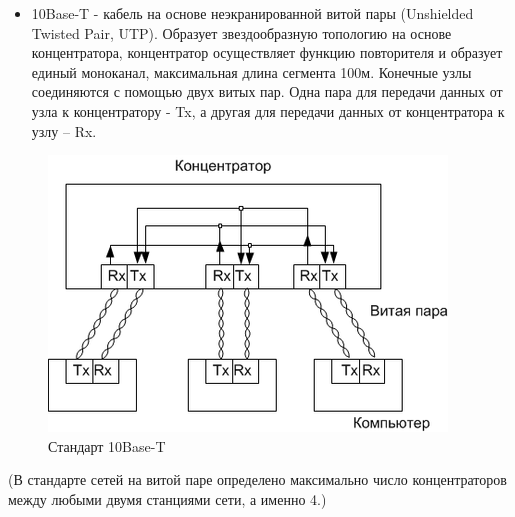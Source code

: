 \begin{itemize}
\item 10Base-T - кабель на основе неэкранированной витой пары (Unshielded Twisted Pair, UTP). Образует звездообразную топологию на основе концентратора, концентратор осуществляет функцию повторителя и образует единый моноканал, максимальная длина сегмента 100м. Конечные узлы соединяются с помощью двух витых пар. Одна пара для передачи данных от узла к концентратору - Tx, а другая для передачи данных от концентратора к узлу – Rx.
\end{itemize}
\begin{figure}[H]
    \begin{center}
	    \includegraphics[scale=0.7]{fig/10Base-T.png}
	    \caption{Стандарт 10Base-T}
	    \label{pic:10Base-T} %
    \end{center}
\end{figure}
    
\noindent(В стандарте сетей на витой паре определено максимально число концентраторов между любыми двумя станциями сети, а именно 4.)

